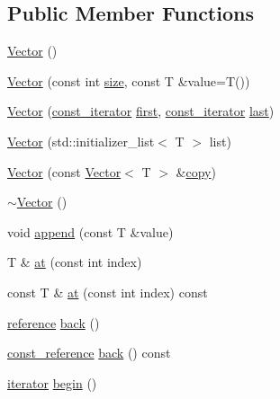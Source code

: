 \subsection*{Public Member Functions}
\begin{DoxyCompactItemize}
\item 
\hyperlink{classprism_1_1_vector_a0081b629c0ab4d85d6847a8cf382f1af}{Vector} ()
\item 
\hyperlink{classprism_1_1_vector_a61d37ac01e42fca59cdf320804a2a7ed}{Vector} (const int \hyperlink{classprism_1_1_vector_ac6ff3296683e76da61d48bcc15e4f175}{size}, const T \&value=T())
\item 
\hyperlink{classprism_1_1_vector_a32d0e9063ca7e7fb4ffed9940ee2b0bf}{Vector} (\hyperlink{classprism_1_1_vector_acc6ed07e2d7ed5065feec92a83e46fa4}{const\+\_\+iterator} \hyperlink{classprism_1_1_vector_a1e2ec6951430f9850702ef7c95a13166}{first}, \hyperlink{classprism_1_1_vector_acc6ed07e2d7ed5065feec92a83e46fa4}{const\+\_\+iterator} \hyperlink{classprism_1_1_vector_aa03291f774fc83f46972b07672fc616c}{last})
\item 
\hyperlink{classprism_1_1_vector_a9a0d26456174aafd6bdae178f68dcd6d}{Vector} (std\+::initializer\+\_\+list$<$ T $>$ list)
\item 
\hyperlink{classprism_1_1_vector_a6df8c0a101ff496b688f4937ec1f13e6}{Vector} (const \hyperlink{classprism_1_1_vector}{Vector}$<$ T $>$ \&\hyperlink{namespaceprism_ae776f4cd825f79e7af1cf6ee1d90a209}{copy})
\item 
\hyperlink{classprism_1_1_vector_a80f2790bb6011dd40739bff844fd3154}{$\sim$\+Vector} ()
\item 
void \hyperlink{classprism_1_1_vector_a690b3be3b217aab2842a5b9b7b0ab4dd}{append} (const T \&value)
\item 
T \& \hyperlink{classprism_1_1_vector_ad47f765360ae83602b645afe23a65541}{at} (const int index)
\item 
const T \& \hyperlink{classprism_1_1_vector_accf072a45a5be33b09d3210df16f52d5}{at} (const int index) const 
\item 
\hyperlink{classprism_1_1_vector_a8ccf98342707efbed82918a44be97438}{reference} \hyperlink{classprism_1_1_vector_a1e19cfd05c60f96f31fb4feba79fe4eb}{back} ()
\item 
\hyperlink{classprism_1_1_vector_a75325487acaa0f63496c110e5a5632bb}{const\+\_\+reference} \hyperlink{classprism_1_1_vector_abae5f68837ada40afa65d7ff492cc79f}{back} () const 
\item 
\hyperlink{classprism_1_1_vector_aa547779173a63f6f8c9b2887498d10eb}{iterator} \hyperlink{classprism_1_1_vector_a4e1871436d85d42653eddf9cf0dac271}{begin} ()

\end{DoxyCompactItemize}
